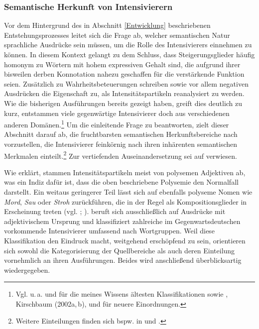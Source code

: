 \subsubsection{Semantische Herkunft von Intensivierern} \label{Quellensemantisch}
Vor dem Hintergrund des in Abschnitt \ref{Entwicklung} beschriebenen Entstehungsprozesses leitet sich die Frage ab, welcher semantischen Natur sprachliche Ausdrücke sein müssen, um die Rolle des Intensivierers einnehmen zu können. In diesem Kontext gelangt \citet[229]{Pittner.1989} zu dem Schluss, dass \glqq{}Steigerungsglieder häufig homonym zu Wörtern mit hohem expressiven Gehalt sind\grqq{}, die aufgrund ihrer bisweilen derben Konnotation nahezu geschaffen für die verstärkende Funktion seien. Zusätzlich zu Wahrheitsbeteuerungen schreiben \citet[50,\,302]{Heine.2002a} sowie \citet[192f.]{Stratton.2020b} vor allem negativen Ausdrücken die Eigenschaft zu, als Intensitätspartikeln reanalysiert zu werden. Wie die bisherigen Ausführungen bereits gezeigt haben, greift dies deutlich zu kurz, entstammen viele gegenwärtige Intensivierer doch aus verschiedenen anderen Domänen.\footnote{Vgl. u.\,a. \citet[]{Hauschild.1899} und \citet[]{Becher.1907} für die meines Wissens ältesten Klassifikationen sowie \citet[]{Suscinskij.1985}, Kirschbaum (2002a,\,b), \citet[]{Nuebling.2004a} und {\citet[]{Breindl.2007}} für neuere Einordnungen.} Um die einleitende Frage zu beantworten, zielt dieser Abschnitt darauf ab, die fruchtbarsten semantischen Herkunftsbereiche nach \citet[]{Claudi.2006} vorzustellen, die Intensivierer feinkörnig nach ihren inhärenten semantischen Merkmalen einteilt.\footnote{Weitere Einteilungen finden sich bspw. in \citet[]{Biedermann.1969} und \citet[]{Os.1989}.} Zur vertiefenden Auseinandersetzung sei auf \citet[]{Laitenberger.2016} verwiesen.

   \par   \label{Quelleneintraeglich}
Wie \citet[353]{Claudi.2006} erklärt, stammen Intensitätspartikeln meist von polysemen Adjektiven ab, was ein Indiz dafür ist, dass die oben beschriebene Polysemie den Normalfall darstellt. Ein weitaus geringerer Teil lässt sich auf ebenfalls polyseme Nomen wie \textit{Mord}, \textit{Sau} oder \textit{Stroh} zurückführen, die in der Regel als Kompositionsglieder in Erscheinung treten (vgl. {\citealt[299]{Pittner.1989}}; {\citealt[140]{Gutzmann.2019a}}). \citet[]{Claudi.2006} beruft sich ausschließlich auf Ausdrücke mit adjektivischem Ursprung und klassifiziert zahlreiche im Gegenwartsdeutschen vorkommende Intensivierer umfassend nach Wortgruppen. Weil diese Klassifikation den Eindruck macht, weitgehend erschöpfend zu sein, orientieren sich sowohl die Kategorisierung der Quellbereiche als auch deren Einteilung vornehmlich an ihren Ausführungen. Beides wird anschließend überblicksartig wiedergegeben.

